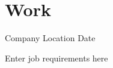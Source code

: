 \section{Work}
 {Company} {Location} {Date}
\begin{entryitems}
    \item{Enter job requirements here}
\end{entryitems}
